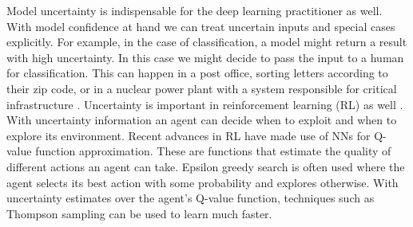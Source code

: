 \documentclass{article}
\theoremstyle{definition}
\begin{document}
%

Model uncertainty is indispensable for the deep learning practitioner as well.
With model confidence at hand we can treat uncertain inputs and special cases explicitly. For example, in the case of classification, a model might return a result with high uncertainty. In this case we might decide to pass the input to a human for classification. This can happen in a post office, sorting letters according to their zip code, or in a nuclear power plant with a system responsible for critical infrastructure \citep{linda2009neural}.
Uncertainty is important in reinforcement learning (RL) as well \citep{szepesvari2010algorithms}. With uncertainty information an agent can decide when to exploit and when to explore its environment. Recent advances in RL have made use of NNs for Q-value function approximation. These are functions that estimate the quality of different actions an agent can take. Epsilon greedy search is often used where the agent selects its best action with some probability and explores otherwise. With uncertainty estimates over the agent's Q-value function, techniques such as Thompson sampling \citep{thompson1933likelihood} can be used to learn much faster. 
\end{document}
